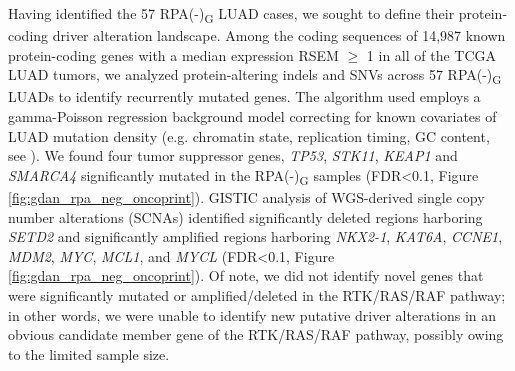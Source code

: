 \documentclass[phd,tocprelim]{cornell}
\begin{document}
Having identified the 57 RPA(-)\textsubscript{G} LUAD cases, we sought to define their protein-coding driver alteration landscape. Among the coding sequences of 14,987 known protein-coding genes with a median expression RSEM $\ge$ 1 in all of the TCGA LUAD tumors, we analyzed protein-altering indels and SNVs across 57 RPA(-)\textsubscript{G} LUADs to identify recurrently mutated genes. The algorithm used employs a gamma-Poisson regression background model \cite{Imielinski2017-nt} correcting for known covariates of LUAD mutation density (e.g. chromatin state, replication timing, GC content, see ). We found four tumor suppressor genes, \textit{TP53}, \textit{STK11}, \textit{KEAP1} and \textit{SMARCA4} significantly mutated in the RPA(-)\textsubscript{G} samples (FDR<0.1, Figure \ref{fig:gdan_rpa_neg_oncoprint}). GISTIC analysis \cite{Mermel2011-gt} of WGS-derived single copy number alterations (SCNAs) identified significantly deleted regions harboring \textit{SETD2} and significantly amplified regions harboring \textit{NKX2-1}, \textit{KAT6A}, \textit{CCNE1}, \textit{MDM2}, \textit{MYC}, \textit{MCL1}, and \textit{MYCL} (FDR<0.1, Figure \ref{fig:gdan_rpa_neg_oncoprint}). Of note, we did not identify novel genes that were significantly mutated or amplified/deleted in the RTK/RAS/RAF pathway; in other words, we were unable to identify new putative driver alterations in an obvious candidate member gene of the RTK/RAS/RAF pathway, possibly owing to the limited sample size.

\end{document}
